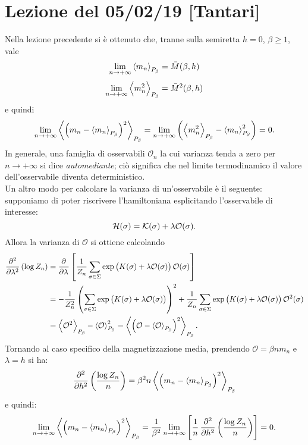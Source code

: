 \section{Lezione del 05/02/19 [Tantari]}
Nella lezione precedente si è ottenuto che, tranne sulla semiretta $ h=0 $, $ \beta \geq 1 $, vale
\[ \lim_{n \to +\infty}\left< m_n \right>_{P_\beta} = \bar{M}(\beta, h) \]
\[ \lim_{n \to +\infty}\left< m_n^2 \right>_{P_\beta} = \bar{M}^2(\beta,h) \]
e quindi
\[ \lim_{n \to +\infty}\left< \left(m_n-\left< m_n \right>_{P_\beta}\right)^2 \right>_{P_\beta} = \lim_{n \to +\infty} \left( \left< m_n^2 \right>_{P_\beta} - \left< m_n \right>^2_{P_\beta} \right) = 0. \]
In generale, una famiglia di osservabili $ \mathcal{O}_n $ la cui varianza tenda a zero per $ n\to +\infty $ si dice \emph{automediante}; ciò significa che nel limite termodinamico il valore dell'osservabile diventa deterministico.\\

Un altro modo per calcolare la varianza di un'osservabile è il seguente:
supponiamo di poter riscrivere l'hamiltoniana esplicitando l'osservabile di interesse:
\[ \mathcal{H}(\sigma) = \mathcal{K}(\sigma) + \lambda\mathcal{O}(\sigma). \]
Allora la varianza di $ \mathcal{O} $ si ottiene calcolando
\begin{align*}
    \dpd[2]{}{\lambda} \left( \log Z_n \right) & = \dpd{}{\lambda} \left[ \frac{1}{Z_n} \sum_{\sigma \in \Sigma} \exp\left( K(\sigma) + \lambda \mathcal{O}(\sigma) \right) \mathcal{O}(\sigma) \right] \\
    & = -\frac{1}{Z_n^2} \left( \sum_{\sigma \in \Sigma} \exp\left( K(\sigma) + \lambda \mathcal{O}(\sigma) \right) \right)^2 + \frac{1}{Z_n} \sum_{\sigma \in \Sigma} \exp\left( K(\sigma) + \lambda \mathcal{O}(\sigma) \right) \mathcal{O}^2(\sigma) \\
    & = \mean{\mathcal{O}^2}_{P_\beta} - \mean{\mathcal{O}}^2_{P_\beta} = \mean{ \left(\mathcal{O} - \mean{\mathcal{O}}_{P_\beta} \right)^2 }_{P_\beta}.
\end{align*}
Tornando al caso specifico della magnetizzazione media, prendendo $ \mathcal{O} = \beta n m_n $  e $ \lambda = h $ si ha:
\[ \dpd[2]{}{h}\left( \frac{\log Z_n}{n} \right) = \beta^2 n \mean{\left(m_n-\mean{m_n}_{P_\beta}\right)^2}_{P_\beta} \]
e quindi:
\[ \lim_{n \to +\infty} \mean{\left(m_n-\mean{m_n}_{P_\beta}\right)^2}_{P_\beta} = \frac{1}{\beta^2} \lim_{n \to +\infty} \left[ \frac{1}{n} \dpd[2]{}{h}\left( \frac{\log Z_n}{n} \right) \right] = 0. \]
\\

